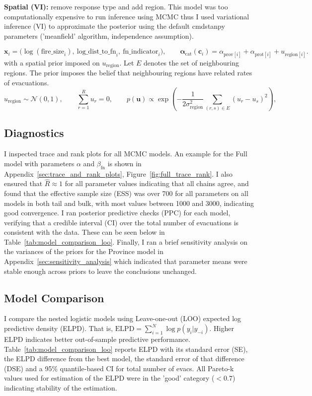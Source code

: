 \textbf{Spatial (VI):} remove response type and add region. This model was too computationally expensive to run inference using MCMC thus I used variational inference (VI) to approximate the posterior using the default cmdstanpy parameters ('meanfield' algorithm, independence assumption).

\[
\mathbf{x}_i = \big(\log(\text{fire\_size}_i),\ \text{log\_dist\_to\_fn}_i,\ \text{fn\_indicator}_i\big),
\qquad
\mathbf{\alpha}_{\mathrm{cat}}(\mathbf{c}_i)
=
\alpha_{\mathrm{prov}[i]} + \alpha_{\mathrm{prot}[i]} + u_{\mathrm{region}[i]}.
\]
with a spatial prior imposed on \(u_{\mathrm{region}}\). Let $E$ denotes the set of neighbouring regions. The prior imposes the belief that neighbouring regions have related rates of evacuations.
\[
u_{\mathrm{region}} \sim \mathcal{N}(0,1), \qquad
\sum_{r=1}^R u_r = 0, \qquad
p(\mathbf{u}) \propto
\exp\left(
-\frac{1}{2\sigma_{\mathrm{region}}^2}
\sum_{(r,s)\in E} (u_r - u_s)^2
\right),
\]
\subsection{Diagnostics}
I inspected trace and rank plots for all MCMC models. An example for the Full model with parameters $\alpha$ and $\beta_{\mathrm{fn}}$ is shown in Appendix~\ref{sec:trace_and_rank_plots}, Figure~\ref{fig:full_trace_rank}. I also ensured that $\hat{R}\approx 1$ for all parameter values indicating that all chains agree, and found that the effective sample size (ESS) was over 700 for all parameters on all models in both tail and bulk, with most values between 1000 and 3000, indicating good convergence. I ran posterior predictive checks (PPC) for each model, verifying that a credible interval (CI) over the total number of evacuations is consistent with the data. These can be seen below in Table~\ref{tab:model_comparison_loo}. Finally, I ran a brief sensitivity analysis on the variances of the priors for the Province model in Appendix~\ref{sec:sensitivity_analysis} which indicated that parameter means were stable enough across priors to leave the conclusions unchanged.

\subsection{Model Comparison}\label{sec:model_comparison}
I compare the nested logistic models using Leave-one-out (LOO) expected log predictive density (ELPD). That is, $\text{ELPD} = \sum_{i=1}^{N} \log p(y_i | y_{-i})$. Higher ELPD indicates better out-of-sample predictive performance. Table~\ref{tab:model_comparison_loo} reports ELPD with its standard error (SE), the ELPD difference from the best model, the standard error of that difference (DSE) and a 95\% quantile-based CI for total number of evacs. All Pareto-k values used for estimation of the ELPD were in the 'good' category ($<0.7$) indicating stability of the estimation.

